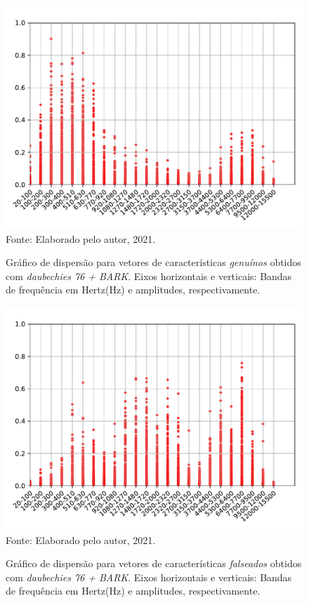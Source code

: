 \begin{figure}[H]
	\centering
	\caption{Gráfico de dispersão para vetores de características \textit{genuínos} obtidos com \textit{daubechies 76 + BARK}.  Eixos horizontais e verticais: Bandas de frequência em Hertz(Hz) e amplitudes, respectivamente.}
	\includegraphics[scale=.8]{./images/results/barkVersusMel/Genuine_daub76_Bark.pdf}
	\label{fig:livedaub76bark}
	\\Fonte: Elaborado pelo autor, 2021.
\end{figure}
\begin{figure}[H]
	\centering
	\caption{Gráfico de dispersão para vetores de características \textit{falseados} obtidos com \textit{daubechies 76 + BARK}.  Eixos horizontais e verticais: Bandas de frequência em Hertz(Hz) e amplitudes, respectivamente.}
	\includegraphics[scale=.8]{./images/results/barkVersusMel/Spoofing_daub76_Bark.pdf}
	\label{fig:spoofingdaub76bark}
	\\Fonte: Elaborado pelo autor, 2021.
\end{figure}
